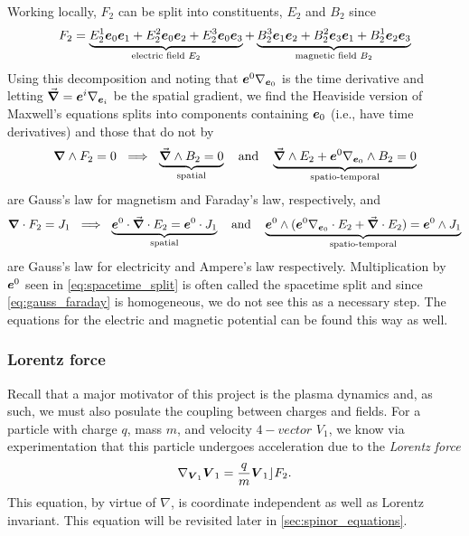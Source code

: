 \documentclass[conf]{new-aiaa}
\begin{document}
Working locally, $F_2$ can be split into constituents, $E_2$ and $B_2$ since
\begin{align}
	F_2 = \underbrace{E_2^1 \boldsymbol{e}_0 \boldsymbol{e}_1 + E_2^2 \boldsymbol{e}_0 \boldsymbol{e}_2 + E_2^3 \boldsymbol{e}_0 \boldsymbol{e}_3}_{\textrm{electric field } E_2} + \underbrace{B_2^{3} \boldsymbol{e}_1 \boldsymbol{e}_2 + B_2^{2} \boldsymbol{e}_3 \boldsymbol{e}_1 + B_2^{1} \boldsymbol{e}_2 \boldsymbol{e}_3}_{\textrm{magnetic field } B_2}
\end{align}
Using this decomposition and noting that $\boldsymbol{e}^0 \nabla_{\boldsymbol{e}_0}$ is the time derivative and letting $\vec{\boldsymbol{\nabla}} = \boldsymbol{e}^i \nabla_{\boldsymbol{e}_i}$ be the spatial gradient,  we find the Heaviside version of Maxwell's equations splits into components containing $\boldsymbol{e}_0$ (i.e., have time derivatives) and those that do not by
\begin{align}
\label{eq:gauss_faraday}
	\boldsymbol{\nabla} \wedge F_2=0 ~\implies~ \underbrace{\vec{\boldsymbol{\nabla}} \wedge B_2 = 0}_{\textrm{spatial}} ~~~\textrm{and}~~~ \underbrace{\vec{\boldsymbol{\nabla}} \wedge E_2 + \boldsymbol{e}^0 \nabla_{\boldsymbol{e}_0} \wedge B_2 = 0}_{\textrm{spatio-temporal}}
\end{align}
are Gauss's law for magnetism and Faraday's law, respectively, and
\begin{align}
\label{eq:spacetime_split}
	\boldsymbol{\nabla} \cdot F_2=J_1 ~\implies~ \underbrace{\boldsymbol{e}^0 \cdot \vec{\boldsymbol{\nabla}} \cdot E_2 = \boldsymbol{e}^0 \cdot J_1}_{\textrm{spatial}}~~~\textrm{and}~~~ \underbrace{\boldsymbol{e}^0 \wedge (\boldsymbol{e}^0 \nabla_{\boldsymbol{e}_0} \cdot E_2 + \vec{\boldsymbol{\nabla}} \cdot E_2) = \boldsymbol{e}^0 \wedge J_1}_{\textrm{spatio-temporal}}
\end{align}
are Gauss's law for electricity and Ampere's law respectively. Multiplication by $\boldsymbol{e}^0$ seen in \cref{eq:spacetime_split} is often called the spacetime split and since \cref{eq:gauss_faraday} is homogeneous, we do not see this as a necessary step. The equations for the electric and magnetic potential can be found this way as well.

\subsubsection{Lorentz force}

Recall that a major motivator of this project is the plasma dynamics and, as such, we must also posulate the coupling between charges and fields. For a particle with charge $q$, mass $m$, and velocity $4-vector$ $V_1$, we know via experimentation that this particle undergoes acceleration due to the \emph{Lorentz force} 
\begin{equation}
    \label{eq:lorentz_force}
    \nabla_{\boldsymbol{V}_1}\boldsymbol{V}_1 = \frac{q}{m} \boldsymbol{V}_1 \rfloor F_2.
\end{equation}
This equation, by virtue of $\nabla$, is coordinate independent as well as Lorentz invariant. This equation will be revisited later in \cref{sec:spinor_equations}.
\end{document}
